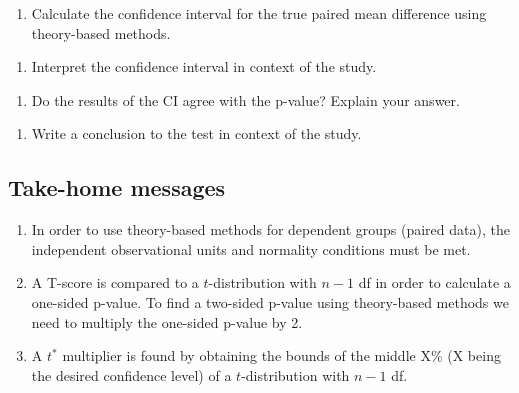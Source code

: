 \documentclass[
]{report}
\providecommand{\tightlist}{%
  \setlength{\itemsep}{0pt}\setlength{\parskip}{0pt}}
\begin{document}
\vspace{0.6in}

\begin{enumerate}
\def\labelenumi{\arabic{enumi}.}
\setcounter{enumi}{11}
\tightlist
\item
  Calculate the confidence interval for the true paired mean difference using theory-based methods.
\end{enumerate}

\vspace{0.6in}

\begin{enumerate}
\def\labelenumi{\arabic{enumi}.}
\setcounter{enumi}{12}
\tightlist
\item
  Interpret the confidence interval in context of the study.
\end{enumerate}

\vspace{1in}

\begin{enumerate}
\def\labelenumi{\arabic{enumi}.}
\setcounter{enumi}{13}
\tightlist
\item
  Do the results of the CI agree with the p-value? Explain your answer.
\end{enumerate}

\vspace{0.5in}

\begin{enumerate}
\def\labelenumi{\arabic{enumi}.}
\setcounter{enumi}{14}
\tightlist
\item
  Write a conclusion to the test in context of the study.
  \vspace{0.6in}
\end{enumerate}

\hypertarget{take-home-messages-18}{%
\subsection{Take-home messages}\label{take-home-messages-18}}

\begin{enumerate}
\def\labelenumi{\arabic{enumi}.}
\item
  In order to use theory-based methods for dependent groups (paired data), the independent observational units and normality conditions must be met.
\item
  A T-score is compared to a \(t\)-distribution with \(n - 1\) df in order to calculate a one-sided p-value. To find a two-sided p-value using theory-based methods we need to multiply the one-sided p-value by 2.
\item
  A \(t^*\) multiplier is found by obtaining the bounds of the middle X\% (X being the desired confidence level) of a \(t\)-distribution with \(n - 1\) df.
\end{enumerate}
\end{document}

